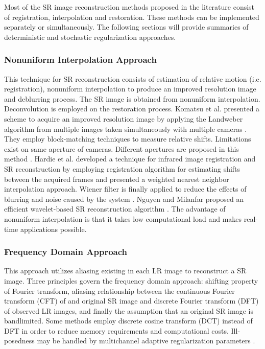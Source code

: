 Most of the SR image reconstruction methods proposed in the literature consist of registration, interpolation and restoration. These methods can be implemented separately or simultaneously. The following sections will provide summaries of deterministic and stochastic regularization approaches. 

\subsubsection{Nonuniform Interpolation Approach} \label{sec45}
This technique for SR reconstruction consists of estimation of relative motion (i.e. registration), nonuniform interpolation to produce an improved resolution image and deblurring process. The SR image is obtained from nonuniform interpolation. Deconvolution is employed on the restoration process. Komatsu et al. presented a scheme to acquire an improved resolution image by applying the Landweber algorithm from multiple images taken simultaneously with multiple cameras \cite{Komatsu1993, Landweber1951}. They employ block-matching techniques to measure relative shifts. Limitations exist on same aperture of cameras. Different apertures are proposed in this method \cite{Komatsu1993b}. Hardie et al. developed a technique for infrared image registration and SR reconstruction by employing registration algorithm for estimating shifts between the acquired frames and presented a weighted nearest neighbor interpolation approach. Wiener filter is finally applied to reduce the effects of blurring and noise caused by the system \cite{Alam2000}. Nguyen and Milanfar proposed an efficient wavelet-based SR reconstruction algorithm \cite{Nguyen2000}. The advantage of nonuniform interpolation is that it takes low computational load and makes real-time applications possible. 

\subsubsection{Frequency Domain Approach}\label{sec2}
This approach utilizes aliasing existing in each LR image to reconstruct a SR image. Three principles govern the frequency domain approach: shifting property of Fourier transform, aliasing relationship between the continuous Fourier transform (CFT) of and original SR image and discrete Fourier transform (DFT) of observed LR images, and finally the assumption that an original SR image is bandlimited. Some methods employ discrete cosine transform (DCT) instead of DFT in order to reduce memory requirements and computational costs. Ill-posedness may be handled by multichannel adaptive regularization parameters \cite{Park2003}. 

